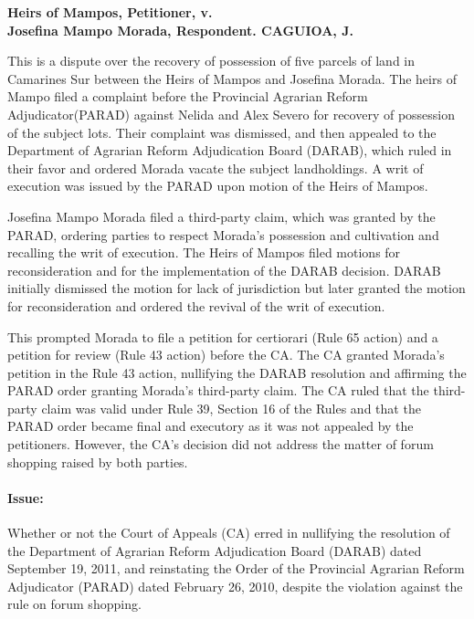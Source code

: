 \documentclass[
12pt,
oneside,
onehalfspacing,
headsepline
]{DigestCollection}
\begin{document}

\noindent\textbf{Heirs of Mampos, Petitioner, v. \\Josefina Mampo Morada, Respondent. CAGUIOA, J.}\vspace{0.4cm}

This is a dispute over the recovery of possession of five parcels of land in Camarines Sur between the Heirs of Mampos and Josefina Morada. The heirs of Mampo filed a complaint before the Provincial Agrarian Reform Adjudicator(PARAD) against Nelida and Alex Severo for recovery of possession of the subject lots. Their complaint was dismissed, and then appealed to the Department of Agrarian Reform Adjudication Board (DARAB), which ruled in their favor and ordered Morada vacate the subject landholdings. A writ of execution was issued by the PARAD upon motion of the Heirs of Mampos.

Josefina Mampo Morada filed a third-party claim, which was granted by the PARAD, ordering parties to respect Morada's possession and cultivation and recalling the writ of execution. The Heirs of Mampos filed motions for reconsideration and for the implementation of the DARAB decision. DARAB initially dismissed the motion for lack of jurisdiction but later granted the motion for reconsideration and ordered the revival of the writ of execution.

This prompted Morada to file a petition for certiorari (Rule 65 action) and a petition for review (Rule 43 action) before the CA. The CA granted Morada's petition in the Rule 43 action, nullifying the DARAB resolution and affirming the PARAD order granting Morada's third-party claim. The CA ruled that the third-party claim was valid under Rule 39, Section 16 of the Rules and that the PARAD order became final and executory as it was not appealed by the petitioners. However, the CA's decision did not address the matter of forum shopping raised by both parties.

\paragraph{Issue:}

Whether or not the Court of Appeals (CA) erred in nullifying the resolution of the Department of Agrarian Reform Adjudication Board (DARAB) dated September 19, 2011, and reinstating the Order of the Provincial Agrarian Reform Adjudicator (PARAD) dated February 26, 2010, despite the violation against the rule on forum shopping.
\end{document}
